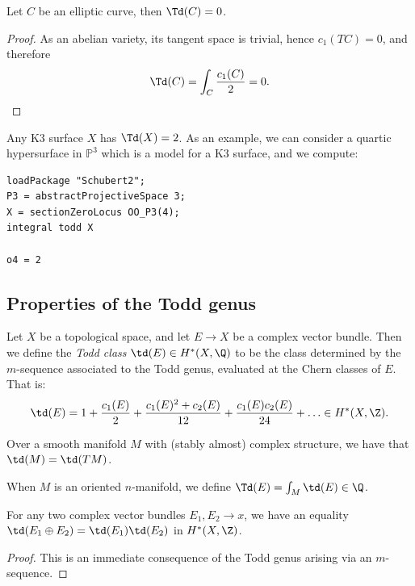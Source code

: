 \documentclass[11pt]{book}
\begin{document}
\begin{example} Let $C$ be an elliptic curve, then $\Td(C) = 0$.
\end{example}
\begin{proof} As an abelian variety, its tangent space is trivial, hence $c_1(TC) = 0$, and therefore
\begin{align*}
    \Td(C) = \int_C \frac{c_1(C)}{2} = 0.
\end{align*}
\end{proof}

\begin{example} Any K3 surface $X$ has $\Td(X) = 2$. As an example, we can consider a quartic hypersurface in $\mathbb{P}^3$ which is a model for a K3 surface, and we compute:
\begin{verbatim}
loadPackage "Schubert2";
P3 = abstractProjectiveSpace 3;
X = sectionZeroLocus OO_P3(4);
integral todd X

o4 = 2
\end{verbatim}
\end{example}

\subsection{Properties of the Todd genus}

\begin{definition}\label{def:td-of-vector-bundle} Let $X$ be a topological space, and let $E \to X$ be a complex vector bundle. Then we define the \emph{Todd class} $\td(E) \in H^\ast(X,\Q)$ to be the class determined by the $m$-sequence associated to the Todd genus, evaluated at the Chern classes of $E$. That is:
\begin{align*}
    \td(E) = 1 + \frac{c_1(E)}{2} + \frac{c_1(E)^2 + c_2(E)}{12} + \frac{c_1(E)c_2(E)}{24} + \ldots \in H^\ast(X,\Z).
\end{align*}
\end{definition}

\begin{example} Over a smooth manifold $M$ with (stably almost) complex structure, we have that $\td(M) = \td(TM)$.
\end{example}

\begin{notation} When $M$ is an oriented $n$-manifold, we define $\Td(E) = \int_M \td(E) \in \Q$.
\end{notation}

\begin{proposition}\label{prop:multiplicativity-of-todd-class}
For any two complex vector bundles $E_1,E_2 \to x$, we have an equality $\td(E_1 \oplus E_2) = \td(E_1) \td(E_2)$ in $H^\ast(X,\Z)$.
\end{proposition}
\begin{proof} This is an immediate consequence of the Todd genus arising via an $m$-sequence.
\end{proof}
\end{document}
